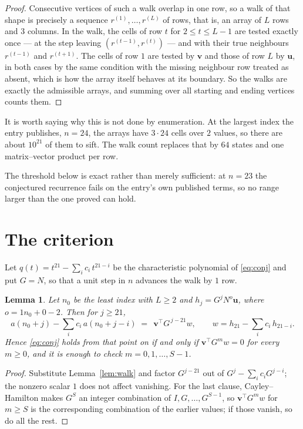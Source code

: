 \documentclass[11pt,a4paper]{article}
\theoremstyle{plain}
\newtheorem{lemma}[theorem]{Lemma}
\theoremstyle{definition}
\begin{document}
\begin{proof}
Consecutive vertices of such a walk overlap in one row, so a walk of that shape is
precisely a sequence $r^{(1)},\dots,r^{(L)}$ of rows, that is, an array of $L$ rows
and $3$ columns. In the walk, the cells of row $t$ for $2\le t\le L-1$ are tested
exactly once --- at the step leaving $(r^{(t-1)},r^{(t)})$ --- and with their true
neighbours $r^{(t-1)}$ and $r^{(t+1)}$. The cells of row $1$ are tested by
$\mathbf{v}$ and those of row $L$ by $\mathbf{u}$, in both cases by the same condition
with the missing neighbour row treated as absent, which is how the array itself behaves at
its boundary. So the walks are exactly the admissible arrays, and summing over all starting
and ending vertices counts them.
\end{proof}


It is worth saying why this is not done by enumeration. At the largest index the entry
publishes, $n=24$, the arrays have $3\cdot24$ cells over
$2$ values, so there are about $10^{21}$ of them to sift. The
walk count replaces that by $64$ states and one matrix--vector product per row.

The threshold below is exact rather than merely sufficient: at $n=23$ the conjectured
recurrence fails on the entry's own published terms, so no range larger than the one proved
can hold.
\section{The criterion}

Let $q(t)=t^{21}-\sum_i c_i\,t^{21-i}$ be the characteristic polynomial of
\eqref{eq:conj} and put $G=N$, so that a unit step in $n$ advances the walk by
$1$ row.

\begin{lemma}\label{lem:crit}
Let $n_0$ be the least index with $L\ge2$ and $h_j=G^{j}N^{o}\mathbf{u}$, where
$o=1n_0+0-2$. Then for $j\ge21$,
\[
a(n_0+j)-\sum_i c_i\,a(n_0+j-i)\;=\;\,\mathbf{v}^{\!\top}G^{\,j-21}w,
\qquad w=h_{21}-\sum_i c_i\,h_{21-i} .
\]
Hence \eqref{eq:conj} holds from that point on if and only if
$\mathbf{v}^{\!\top}G^{m}w=0$ for every $m\ge0$, and it is enough to check
$m=0,1,\dots,S-1$.
\end{lemma}

\begin{proof}
Substitute Lemma~\ref{lem:walk} and factor $G^{j-21}$ out of
$G^{j}-\sum_ic_iG^{j-i}$; the nonzero scalar $1$ does not affect
vanishing. For the last clause, Cayley--Hamilton makes $G^{S}$ an integer combination of
$I,G,\dots,G^{S-1}$, so $\mathbf{v}^{\!\top}G^{m}w$ for $m\ge S$ is the corresponding
combination of the earlier values; if those vanish, so do all the rest.
\end{proof}
\end{document}
